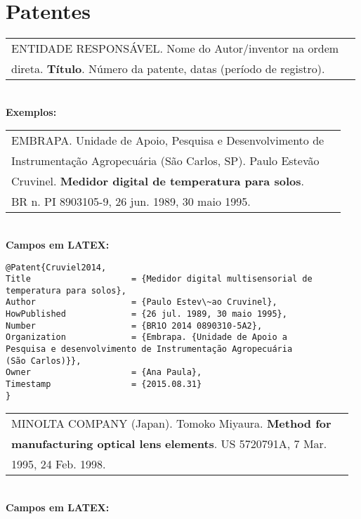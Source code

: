 \section{Patentes}

\begin{tabular}{|l|c|} \hline
ENTIDADE RESPONSÁVEL. Nome do Autor/inventor na ordem \\direta. \textbf{Título}. Número da patente, datas (período de registro).
	\\\hline
\end{tabular} \\

\textbf{Exemplos:} \\

\begin{tabular}{|l|c|} \hline
EMBRAPA. Unidade de Apoio, Pesquisa e Desenvolvimento de
\\Instrumentação Agropecuária (São Carlos, SP). Paulo Estevão \\Cruvinel. \textbf{Medidor digital de temperatura para solos}. \\BR n. PI 8903105-9, 26 jun. 1989, 30 maio 1995. 
	\\\hline
\end{tabular} \\

\textbf{Campos em LATEX:} 

\begin{verbatim}
@Patent{Cruviel2014,
Title                    = {Medidor digital multisensorial de 
temperatura para solos},
Author                   = {Paulo Estev\~ao Cruvinel},
HowPublished             = {26 jul. 1989, 30 maio 1995},
Number                   = {BR1O 2014 0890310-5A2},
Organization             = {Embrapa. {Unidade de Apoio a 
Pesquisa e desenvolvimento de Instrumentação Agropecuária 
(São Carlos)}},
Owner                    = {Ana Paula},
Timestamp                = {2015.08.31}
}
\end{verbatim}

\begin{tabular}{|l|c|} \hline
MINOLTA COMPANY (Japan). Tomoko Miyaura. \textbf{Method for}\\ \textbf{manufacturing optical lens} \textbf{elements}. US 5720791A, 7 Mar. \\1995, 24
Feb. 1998. 
	\\\hline
\end{tabular} \\

\textbf{Campos em LATEX:} 

